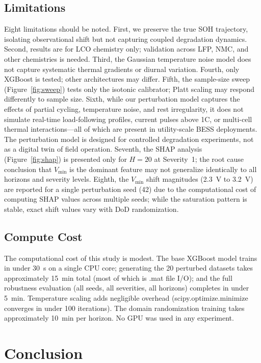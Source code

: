 \documentclass[11pt,a4paper]{article}
\begin{document}
\subsection{Limitations}

Eight limitations should be noted. First, we preserve the true SOH trajectory, isolating observational shift but not capturing coupled degradation dynamics. Second, results are for LCO chemistry only; validation across LFP, NMC, and other chemistries is needed. Third, the Gaussian temperature noise model does not capture systematic thermal gradients or diurnal variation. Fourth, only XGBoost is tested; other architectures may differ. Fifth, the sample-size sweep (Figure~\ref{fig:sweep}) tests only the isotonic calibrator; Platt scaling may respond differently to sample size. Sixth, while our perturbation model captures the effects of partial cycling, temperature noise, and rest irregularity, it does not simulate real-time load-following profiles, current pulses above 1C, or multi-cell thermal interactions---all of which are present in utility-scale BESS deployments. The perturbation model is designed for controlled degradation experiments, not as a digital twin of field operation. Seventh, the SHAP analysis (Figure~\ref{fig:shap}) is presented only for \(H=20\) at Severity~1; the root cause conclusion that \(V_{\text{min}}\) is the dominant feature may not generalize identically to all horizons and severity levels. Eighth, the \(V_{\text{min}}\) shift magnitudes (2.3~V to 3.2~V) are reported for a single perturbation seed (42) due to the computational cost of computing SHAP values across multiple seeds; while the saturation pattern is stable, exact shift values vary with DoD randomization.

\subsection{Compute Cost}

The computational cost of this study is modest. The base XGBoost model trains in under 30~s on a single CPU core; generating the 20 perturbed datasets takes approximately 15~min total (most of which is .mat file I/O); and the full robustness evaluation (all seeds, all severities, all horizons) completes in under 5~min. Temperature scaling adds negligible overhead (scipy.optimize.minimize converges in under 100 iterations). The domain randomization training takes approximately 10~min per horizon. No GPU was used in any experiment.

\section{Conclusion}
\end{document}
